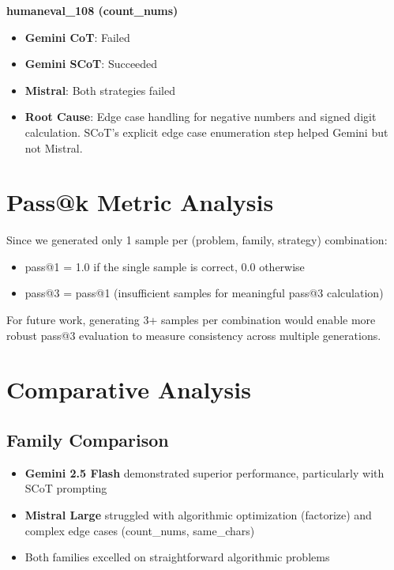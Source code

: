 \documentclass[11pt]{article}
\begin{document}
\textbf{humaneval\_108 (count\_nums)}

\begin{itemize}
    \item \textbf{Gemini CoT}: Failed
    \item \textbf{Gemini SCoT}: Succeeded
    \item \textbf{Mistral}: Both strategies failed
    \item \textbf{Root Cause}: Edge case handling for negative numbers and signed digit calculation. SCoT's explicit edge case enumeration step helped Gemini but not Mistral.
\end{itemize}

\section{Pass@k Metric Analysis}

Since we generated only 1 sample per (problem, family, strategy) combination:
\begin{itemize}
    \item pass@1 = 1.0 if the single sample is correct, 0.0 otherwise
    \item pass@3 = pass@1 (insufficient samples for meaningful pass@3 calculation)
\end{itemize}

For future work, generating 3+ samples per combination would enable more robust pass@3 evaluation to measure consistency across multiple generations.

\section{Comparative Analysis}

\subsection{Family Comparison}

\begin{itemize}
    \item \textbf{Gemini 2.5 Flash} demonstrated superior performance, particularly with SCoT prompting
    \item \textbf{Mistral Large} struggled with algorithmic optimization (factorize) and complex edge cases (count\_nums, same\_chars)
    \item Both families excelled on straightforward algorithmic problems
\end{itemize}
\end{document}
